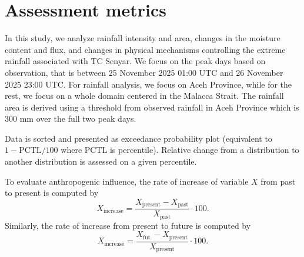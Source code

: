 
\section{Assessment metrics}
In this study, we analyze rainfall intensity and area, changes in the moisture content and flux, and changes in physical mechanisms controlling the extreme rainfall associated with TC Senyar. We focus on the peak days based on observation, that is between 25 November 2025 01:00 UTC and 26 November 2025 23:00 UTC. For rainfall analysis, we focus on Aceh Province, while for the rest, we focus on a whole domain centered in the Malacca Strait. The rainfall area is derived using a threshold from observed rainfall in Aceh Province which is 300 mm over the full two peak days. 

Data is sorted and presented as exceedance probability plot (equivalent to $1-\text{PCTL}/100$ where $\text{PCTL}$ is percentile). Relative change from a distribution to another distribution is assessed on a given percentile.

To evaluate anthropogenic influence, the rate of increase of variable $X$ from past to present is computed by
\begin{equation} \label{eq:increase-1}
    X_{\text{increase}} = \frac{X_\text{present} - X_{\text{past}}}{X_{\text{past}}} \cdot 100.
\end{equation} 
Similarly, the rate of increase from present to future is computed by
\begin{equation} \label{eq:increase-2}
    X_{\text{increase}} = \frac{X_{\text{fut.}} - X_\text{present}}{X_\text{present}} \cdot 100.
\end{equation}

